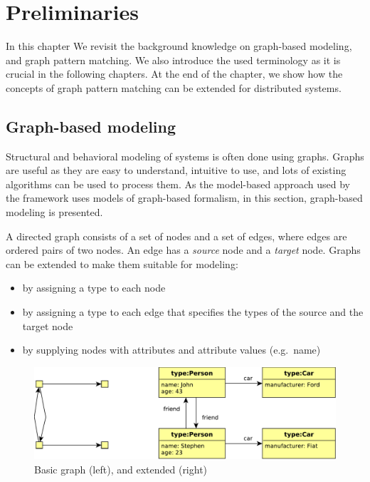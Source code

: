 
\chapter{Preliminaries}

In this chapter We revisit the background knowledge on graph-based modeling, and graph pattern matching. We also introduce the used terminology as it is crucial in the following chapters. At the end of the chapter, we show how the concepts of graph pattern matching can be extended for distributed systems.

\section{Graph-based modeling}

Structural and behavioral modeling of systems is often done using graphs. 
Graphs are useful as they are easy to understand, intuitive to use, and lots of existing algorithms can be used to process them. 
As the model-based approach used by the framework uses models of graph-based formalism, in this section, graph-based modeling is presented.

A directed graph consists of a set of nodes and a set of edges, where edges are ordered pairs of two nodes. An edge has a \emph{source} node and a \emph{target} node. 
Graphs can be extended to make them suitable for modeling:

\begin{itemize}
	\item by assigning a type to each node
	\item by assigning a type to each edge that specifies the types of the source and the target node
	\item by supplying nodes with attributes and attribute values (e.g.\ name)
\end{itemize}


\begin{figure}[H]
	\begin{center}
		\includegraphics[width=\textwidth]{figures/graphs.pdf}
		\caption{Basic graph (left), and extended (right) }
		\label{fig:graphs}
	\end{center}
\end{figure}

